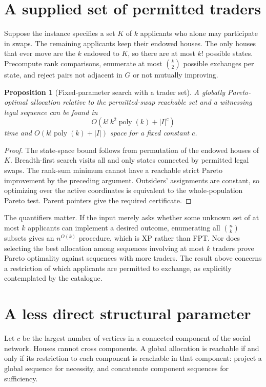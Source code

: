 \documentclass[11pt]{article}
\newtheorem{proposition}{Proposition}
\begin{document}
\section*{A supplied set of permitted traders}
Suppose the instance specifies a set $K$ of $k$ applicants who alone may participate in swaps. The remaining applicants keep their endowed houses. The only houses that ever move are the $k$ endowed to $K$, so there are at most $k!$ possible states. Precompute rank comparisons, enumerate at most $\binom k2$ possible exchanges per state, and reject pairs not adjacent in $G$ or not mutually improving.

\begin{proposition}[Fixed-parameter search with a trader set]
A globally Pareto-optimal allocation relative to the permitted-swap reachable set and a witnessing legal sequence can be found in
\[
 O(k!\,k^2\operatorname{poly}(k)+|I|^c)
\]
time and $O(k!\operatorname{poly}(k)+|I|)$ space for a fixed constant $c$.
\end{proposition}
\begin{proof}
The state-space bound follows from permutation of the endowed houses of $K$. Breadth-first search visits all and only states connected by permitted legal swaps. The rank-sum minimum cannot have a reachable strict Pareto improvement by the preceding argument. Outsiders' assignments are constant, so optimizing over the active coordinates is equivalent to the whole-population Pareto test. Parent pointers give the required certificate.
\end{proof}

The quantifiers matter. If the input merely asks whether some unknown set of at most $k$ applicants can implement a desired outcome, enumerating all $\binom nk$ subsets gives an $n^{O(k)}$ procedure, which is XP rather than FPT. Nor does selecting the best allocation among sequences involving at most $k$ traders prove Pareto optimality against sequences with more traders. The result above concerns a restriction of which applicants are permitted to exchange, as explicitly contemplated by the catalogue.

\section*{A less direct structural parameter}
Let $c$ be the largest number of vertices in a connected component of the social network. Houses cannot cross components. A global allocation is reachable if and only if its restriction to each component is reachable in that component: project a global sequence for necessity, and concatenate component sequences for sufficiency.
\end{document}
